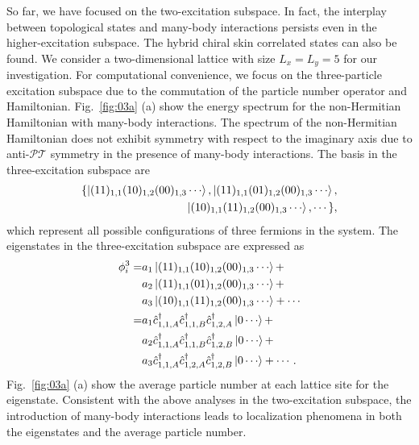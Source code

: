 \documentclass[longbibliography, aps, prx, amsmath, amssymb, amsfonts, twocolumn,superscriptaddress, footinbib]{revtex4-1}
\begin{document}
	So far, we have focused on the two-excitation subspace. In fact, the interplay between topological states and many-body interactions persists even in the higher-excitation subspace. The hybrid chiral skin correlated states can also be found. 
	We consider a two-dimensional lattice with size $L_x = L_y = 5$ for our investigation. For computational convenience, we focus on the three-particle excitation subspace due to the commutation of the particle number operator and Hamiltonian. 
	Fig.~\ref{fig:03a} (a) show the energy spectrum
	for the non-Hermitian Hamiltonian with many-body interactions. 
	The spectrum of the non-Hermitian Hamiltonian does not exhibit symmetry with respect to the imaginary axis due to anti-$\mathcal{PT}$ symmetry in the presence of many-body interactions. 
	The basis in the three-excitation subspace are
	\begin{equation}
		\begin{split}
		\{\ket{(11)_{1,1}(10)_{1,2}(00)_{1,3}\cdots}, \ket{(11)_{1,1}(01)_{1,2}(00)_{1,3}\cdots}, \\
		\ket{(10)_{1,1}(11)_{1,2}(00)_{1,3}\cdots},\cdots\}, 
		\end{split}
	\end{equation}
	which represent all possible configurations of three fermions in the system. 
	The eigenstates in the three-excitation subspace are expressed as 
	\begin{equation}
		\begin{split}
			\phi_i^3 =& a_1 \ket{(11)_{1,1}(10)_{1,2}(00)_{1,3}\cdots} +\\
			&a_2 \ket{(11)_{1,1}(01)_{1,2}(00)_{1,3}\cdots} +\\
			&a_3 \ket{(10)_{1,1}(11)_{1,2}(00)_{1,3}\cdots} + \cdots\\
			=& a_1 \hat{c}_{1,1,A}^{\dagger}\hat{c}_{1,1,B}^{\dagger}\hat{c}_{1,2,A}^{\dagger} \ket{0\cdots} +\\
			&a_2 \hat{c}_{1,1,A}^{\dagger}\hat{c}_{1,1,B}^{\dagger}\hat{c}_{1,2,B}^{\dagger} \ket{0\cdots} + \\
			&a_3 \hat{c}_{1,1,A}^{\dagger}\hat{c}_{1,2,A}^{\dagger}\hat{c}_{1,2,B}^{\dagger} \ket{0\cdots} + \cdots.
		\end{split}
	\end{equation}
	Fig.~\ref{fig:03a} (a) show the average particle number at each lattice site for the eigenstate. 
	Consistent with the above analyses in the two-excitation subspace, the introduction of many-body interactions leads to localization phenomena in both the eigenstates and the average particle number.
\end{document}
